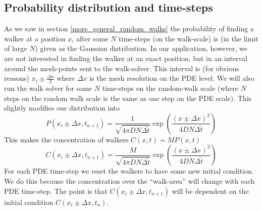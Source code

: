 \subsection{Probability distribution and time-steps}\label{probability_distribution_and_timesteps}
As we saw in section \ref{more_general_random_walks} the probability of finding a walker at a position $x_i$ after some $N$ time-steps (on the walk-scale) is (in the limit of large $N$) given as the Gaussian distribution. 
In our application, however, we are not interested in finding the walker at an exact position, but in an interval around the mesh-points sent to the walk-solver. 
This interval is (for obvious reasons) $x_i\pm\frac{\Delta x}{2}$ where $\Delta x$ is the mesh resolution on the PDE level. 
We will also run the walk solver for some $N$ time-steps on the random-walk scale (where $N$ steps on the random walk scale is the same as one step on the PDE scale). 
This slightly modifies our distribution into
\begin{equation}
 P(x_i\pm\Delta x,t_{n+1}) = \frac{1}{\sqrt{4\pi DN\Delta \tilde{t}}}\exp\left(\frac{(x\pm\Delta x)^2}{4DN\Delta \tilde{t}}\right)
\end{equation}
This makes the concentration of walkers $C(x,t) = MP(x,t)$
\begin{equation}
 C(x_i\pm\Delta x,t_{n+1}) = \frac{M}{\sqrt{4\pi DN\Delta \tilde{t}}}\exp\left(\frac{(x\pm\Delta x)^2}{4DN\Delta \tilde{t}}\right)
\end{equation}
For each PDE time-step we reset the walkers to have some new initial condition. 
We do this because the concentration over the ``walk-area'' will change with each PDE time-step.
The point is that $ C(x_i\pm\Delta x,t_{n+1})$ will be dependent on the initial condition $ C(x_i\pm\Delta x,t_{n})$.


